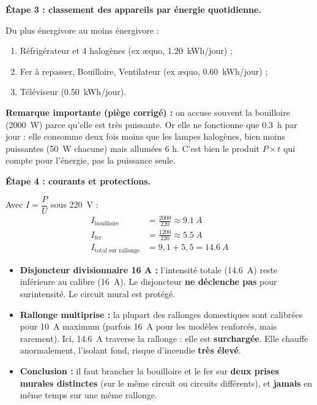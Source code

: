 \documentclass[11pt]{article}
\begin{document}
\begin{exoresolu}
\textbf{Étape 3 : classement des appareils par énergie quotidienne.}

Du plus énergivore au moins énergivore :
\begin{enumerate}
\item Réfrigérateur et 4 halogènes (ex æquo, \SI{1,20}{kWh/jour}) ;
\item Fer à repasser, Bouilloire, Ventilateur (ex æquo, \SI{0,60}{kWh/jour}) ;
\item Téléviseur (\SI{0,50}{kWh/jour}).
\end{enumerate}

\textbf{Remarque importante (piège corrigé) :} on accuse souvent la bouilloire (\SI{2000}{W}) parce qu'elle est très puissante. Or elle ne fonctionne que \SI{0,3}{h} par jour : elle consomme deux fois moins que les lampes halogènes, bien moins puissantes (\SI{50}{W} chacune) mais allumées 6 h. C'est bien le produit $P \times t$ qui compte pour l'énergie, pas la puissance seule.

\textbf{Étape 4 : courants et protections.}

Avec $I = \dfrac{P}{U}$ sous \SI{220}{V} :
\begin{align*}
I_{\text{bouilloire}} &= \frac{2000}{220} \approx \SI{9,1}{A} \\
I_{\text{fer}} &= \frac{1200}{220} \approx \SI{5,5}{A} \\
I_{\text{total sur rallonge}} &= 9{,}1 + 5{,}5 = \SI{14,6}{A}
\end{align*}

\begin{itemize}
\item \textbf{Disjoncteur divisionnaire 16 A :} l'intensité totale (\SI{14,6}{A}) reste inférieure au calibre (\SI{16}{A}). Le disjoncteur \textbf{ne déclenche pas} pour surintensité. Le circuit mural est protégé.
\item \textbf{Rallonge multiprise :} la plupart des rallonges domestiques sont calibrées pour \SI{10}{A} maximum (parfois \SI{16}{A} pour les modèles renforcés, mais rarement). Ici, \SI{14,6}{A} traverse la rallonge : elle est \textbf{surchargée}. Elle chauffe anormalement, l'isolant fond, risque d'incendie \textbf{très élevé}.
\item \textbf{Conclusion :} il faut brancher la bouilloire et le fer sur \textbf{deux prises murales distinctes} (sur le même circuit ou circuits différents), et \textbf{jamais} en même temps sur une même rallonge.
\end{itemize}


\end{exoresolu}
\end{document}
